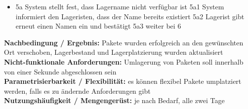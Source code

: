 \begin{itemize}
	\item 5a System stellt fest, dass Lagername nicht verfügbar ist
		\subitem 5a1 System informiert den Lageristen, dass der Name bereits existiert
		\subitem 5a2 Lagerist gibt erneut einen Namen ein und bestätigt
		\subitem 5a3 weiter bei 6\\
\end{itemize}
\textbf{Nachbedingung / Ergebnis:} Pakete wurden erfolgreich an den gewünschten Ort verschoben, Lagerbestand und Lagerplatzierung wurden aktualisiert\\
\textbf{Nicht-funktionale Anforderungen:} Umlagerung von Paketen soll innerhalb von einer Sekunde abgeschlossen sein\\
\textbf{Parametrisierbarkeit / Flexibilität:} es können flexibel Pakete umplatziert werden, falls es zu ändernde Anforderungen gibt\\
\textbf{Nutzungshäufigkeit / Mengengerüst:} je nach Bedarf, alle zwei Tage

